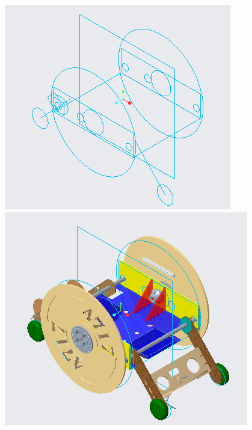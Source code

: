 \begin{figure}[h!]
\centering
\begin{minipage}{.48\textwidth}
  \centering
  \includegraphics[width= .8\linewidth]{Design_Overview/Stabilization_Skeleton.PNG}
\end{minipage}%
\hfill
\begin{minipage}{.48\textwidth}
  \centering
  \includegraphics[width= .8\linewidth]{Design_Overview/Skel.PNG}
\end{minipage}
\end{figure}


